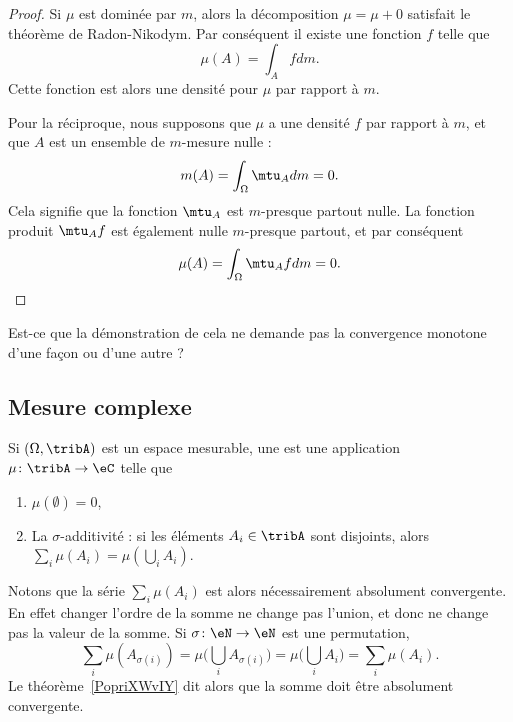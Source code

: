 \begin{proof}
	Si \( \mu\) est dominée par \( m\), alors la décomposition \( \mu=\mu+0\) satisfait le théorème de Radon-Nikodym. Par conséquent il existe une fonction \( f\) telle que
	\begin{equation}
		\mu(A)=\int_Afdm.
	\end{equation}
	Cette fonction est alors une densité pour \( \mu\) par rapport à \( m\).

	Pour la réciproque, nous supposons que \( \mu\) a une densité \( f\) par rapport à \( m\), et que \( A\) est un ensemble de \( m\)-mesure nulle :
	\begin{equation}
		m(A)=\int_{\Omega}\mtu_Adm=0.
	\end{equation}
	Cela signifie que la fonction \( \mtu_A\) est \( m\)-presque partout nulle. La fonction produit \( \mtu_Af\) est également nulle \( m\)-presque partout, et par conséquent
	\begin{equation}
		\mu(A)=\int_{\Omega}\mtu_Afdm=0.
	\end{equation}
\end{proof}

\begin{probleme}
	Est-ce que la démonstration de cela ne demande pas la convergence monotone d'une façon ou d'une autre ?
\end{probleme}

\subsection{Mesure complexe}

\begin{definition} \label{DefGKHLooYjocEt}
	Si \( (\Omega,\tribA)\) est un espace mesurable, une  est une application \( \mu\colon \tribA\to \eC\) telle que
	\begin{enumerate}
		\item
		      \( \mu(\emptyset)=0\),
		\item
		      La \( \sigma\)-additivité : si les éléments \( A_i\in\tribA\) sont disjoints, alors \( \sum_i\mu(A_i)=\mu(\bigcup_iA_i)\).
	\end{enumerate}
\end{definition}
Notons que la série \( \sum_i\mu(A_i)\) est alors nécessairement absolument convergente. En effet changer l'ordre de la somme ne change pas l'union, et donc ne change pas la valeur de la somme. Si \( \sigma\colon \eN\to \eN\) est une permutation,
\begin{equation}
	\sum_i\mu(A_{\sigma(i)})=\mu\big( \bigcup_iA_{\sigma(i)} \big)=\mu\big( \bigcup_iA_i \big)=\sum_i\mu(A_i).
\end{equation}
Le théorème~\ref{PopriXWvIY} dit alors que la somme doit être absolument convergente.


